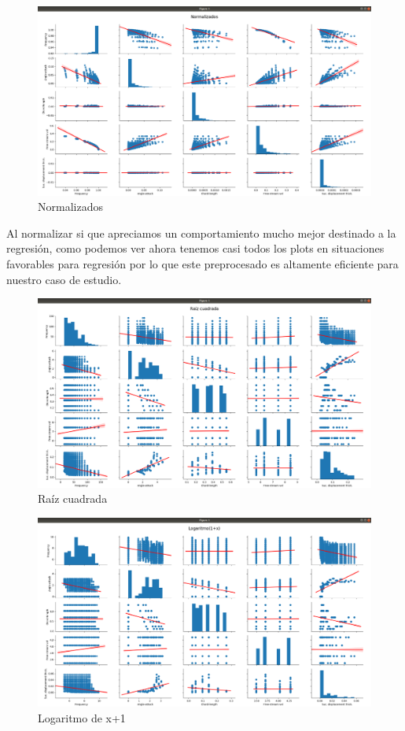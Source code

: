 \documentclass[12pt,a4paper]{article}
\begin{document}
\begin{figure}[H]
	\centering
	\includegraphics[scale=0.27]{./Imagenes/REG_normalizados.png}
	\caption{Normalizados}
\end{figure}

Al normalizar si que apreciamos un comportamiento mucho mejor destinado a la regresión, como podemos ver ahora tenemos casi todos los plots en situaciones favorables para regresión por lo que este preprocesado es altamente eficiente para nuestro caso de estudio.

\begin{figure}[H]
	\centering
	\includegraphics[scale=0.27]{./Imagenes/REG_raiz_cuadrada.png}
	\caption{Raíz cuadrada}
\end{figure}

\begin{figure}[H]
	\centering
	\includegraphics[scale=0.27]{./Imagenes/REG_logaritmo.png}
	\caption{Logaritmo de x+1}
\end{figure}
\end{document}
